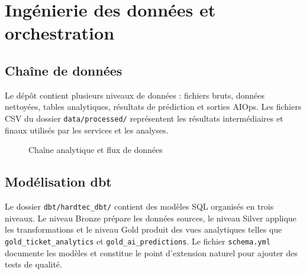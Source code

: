 \documentclass[11pt,a4paper]{report}
\begin{document}
\chapter{Ingénierie des données et orchestration}
\section{Chaîne de données}
Le dépôt contient plusieurs niveaux de données : fichiers bruts, données nettoyées, tables analytiques, résultats de prédiction et sorties AIOps. Les fichiers CSV du dossier \texttt{data/processed/} représentent les résultats intermédiaires et finaux utilisés par les services et les analyses.

\begin{figure}[H]
\centering
{}
\caption{Chaîne analytique et flux de données}
\end{figure}

\section{Modélisation dbt}
Le dossier \texttt{dbt/hardtec\_dbt/} contient des modèles SQL organisés en trois niveaux. Le niveau Bronze prépare les données sources, le niveau Silver applique les transformations et le niveau Gold produit des vues analytiques telles que \texttt{gold\_ticket\_analytics} et \texttt{gold\_ai\_predictions}. Le fichier \texttt{schema.yml} documente les modèles et constitue le point d’extension naturel pour ajouter des tests de qualité.
\end{document}

